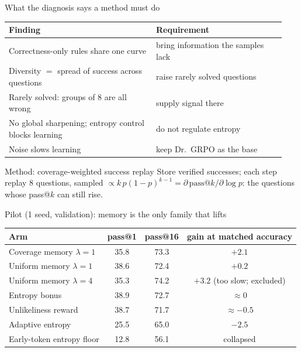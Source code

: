 \documentclass[aspectratio=169,11pt]{beamer}
\begin{document}
\begin{frame}{What the diagnosis says a method must do}
\small
\begin{tabular}{@{}p{0.5\linewidth}p{0.44\linewidth}@{}}
\toprule
Finding & Requirement\\
\midrule
Correctness-only rules share one curve & bring information the samples lack\\
Diversity $=$ spread of success across questions & raise rarely solved questions\\
Rarely solved: groups of 8 are all wrong & supply signal there\\
No global sharpening; entropy control blocks learning & do not regulate entropy\\
Noise slows learning & keep Dr.\ GRPO as the base\\
\bottomrule
\end{tabular}
\vspace{6pt}
\begin{block}{Method: coverage-weighted success replay}
Store verified successes; each step replay 8 questions, sampled $\propto k\,p(1-p)^{k-1}=\partial\,\mathrm{pass@}k/\partial\log p$: the questions whose pass@$k$ can still rise.
\end{block}
\end{frame}

\begin{frame}{Pilot (1 seed, validation): memory is the only family that lifts}
\small\centering
\begin{tabular}{@{}lccc@{}}
\toprule
Arm & pass@1 & pass@16 & gain at matched accuracy\\
\midrule
Coverage memory $\lambda=1$ & 35.8 & 73.3 & \textcolor{good}{$+2.1$}\\
Uniform memory $\lambda=1$ & 38.6 & 72.4 & $+0.2$\\
Uniform memory $\lambda=4$ & 35.3 & 74.2 & $+3.2$ (too slow; excluded)\\
Entropy bonus & 38.9 & 72.7 & $\approx0$\\
Unlikeliness reward & 38.7 & 71.7 & $\approx-0.5$\\
Adaptive entropy & 25.5 & 65.0 & \textcolor{bad}{$-2.5$}\\
Early-token entropy floor & 12.8 & 56.1 & \textcolor{bad}{collapsed}\\
\bottomrule
\end{tabular}
\end{frame}
\end{document}
